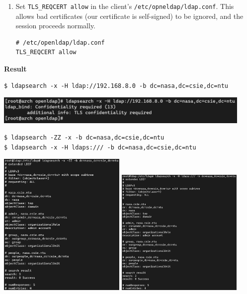 \documentclass[12pt, a4paper]{article}
\begin{document}
\begin{enumerate}[label=(\alph*)]
\begin{enumerate}[label=(\arabic*)]
      \item Set \verb|TLS_REQCERT allow| in the client's \verb|/etc/opneldap/ldap.conf|.
      This allows bad certificates (our certificate is self-signed) to be ignored, and the
      session proceeds normally.
      \begin{Verbatim}[frame=single]
# /etc/openldap/ldap.conf
TLS_REQCERT allow
      \end{Verbatim}
    \end{enumerate}

    \textbf{Result}
    \begin{Verbatim}[frame=single]
$ ldapsearch -x -H ldap://192.168.8.0 -b dc=nasa,dc=csie,dc=ntu
    \end{Verbatim}

    \includegraphics[width=0.93\textwidth]{2-b_ldapsearch_denied.png}

    \begin{Verbatim}[frame=single]
$ ldapsearch -ZZ -x -b dc=nasa,dc=csie,dc=ntu
$ ldapsearch -x -H ldaps:/// -b dc=nasa,dc=csie,dc=ntu
    \end{Verbatim}

    \includegraphics[width=0.46\textwidth]{1-b_ldapsearch_starttls.png}
    \includegraphics[width=0.46\textwidth]{1-b_ldapsearch_ldaps.png}


\end{enumerate}
\end{document}
